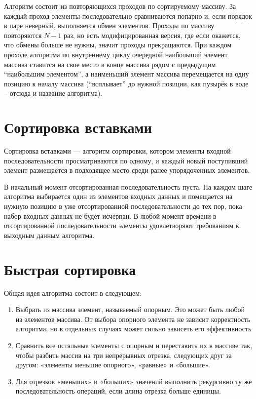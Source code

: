\documentclass[12pt]{report}
\begin{document}
Алгоритм состоит из повторяющихся проходов по сортируемому массиву.
За каждый проход элементы последовательно сравниваются попарно и, если порядок в паре неверный, выполняется обмен элементов.
Проходы по массиву повторяются $N-1$ раз, но есть модифицированная версия, где если окажется, что обмены больше не нужны, значит проходы прекращаются.
При каждом проходе алгоритма по внутреннему циклу очередной наибольший элемент массива ставится на свое место в конце массива рядом с предыдущим ``наибольшим элементом'', а наименьший элемент массива перемещается на одну позицию к началу массива (``всплывает'' до нужной позиции, как пузырёк в воде -- отсюда и название алгоритма).

\section{Сортировка вставками}

Сортировка вставками — алгоритм сортировки, котором элементы входной последовательности просматриваются по одному, и каждый новый поступивший элемент размещается в подходящее место среди ранее упорядоченных элементов.

В начальный момент отсортированная последовательность пуста.
На каждом шаге алгоритма выбирается один из элементов входных данных и помещается на нужную позицию в уже отсортированной последовательности до тех пор, пока набор входных данных не будет исчерпан.
В любой момент времени в отсортированной последовательности элементы удовлетворяют требованиям к выходным данным алгоритма.

\section{Быстрая сортировка}

Общая идея алгоритма состоит в следующем:

\begin{enumerate}
	\item Выбрать из массива элемент, называемый опорным. Это может быть любой из элементов массива. От выбора опорного элемента не зависит корректность алгоритма, но в отдельных случаях может сильно зависеть его эффективность 
	\item Сравнить все остальные элементы с опорным и переставить их в массиве так, чтобы разбить массив на три непрерывных отрезка, следующих друг за другом: «элементы меньшие опорного», «равные» и «большие».
	\item Для отрезков «меньших» и «больших» значений выполнить рекурсивно ту же последовательность операций, если длина отрезка больше единицы.
\end{enumerate}
\end{document}
